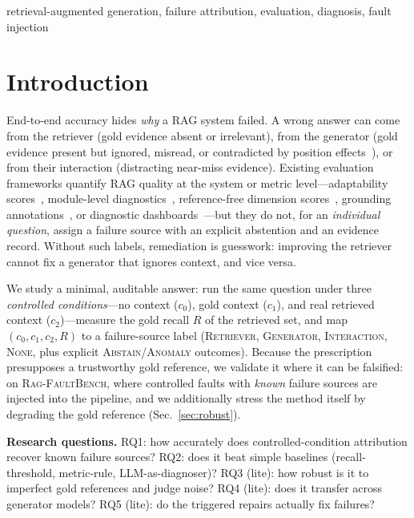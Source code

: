 \documentclass[conference]{IEEEtran}
\begin{document}
\begin{IEEEkeywords}
retrieval-augmented generation, failure attribution, evaluation, diagnosis,
fault injection
\end{IEEEkeywords}

\section{Introduction}
End-to-end accuracy hides \emph{why} a RAG system failed. A wrong answer can
come from the retriever (gold evidence absent or irrelevant), from the
generator (gold evidence present but ignored, misread, or contradicted by
position effects~\cite{liu2024lost}), or from their interaction (distracting
near-miss evidence). Existing evaluation frameworks quantify RAG quality at
the system or metric level---adaptability scores~\cite{park2025mirage},
module-level diagnostics~\cite{ru2024ragchecker}, reference-free dimension
scores~\cite{es2024ragas}, grounding annotations~\cite{sorodoc2025garage},
or diagnostic dashboards~\cite{murugaraj2026ragvue}---but they do not, for an
\emph{individual question}, assign a failure source with an explicit
abstention and an evidence record. Without such labels, remediation is
guesswork: improving the retriever cannot fix a generator that ignores
context, and vice versa.

We study a minimal, auditable answer: run the same question under three
\emph{controlled conditions}---no context ($c_0$), gold context ($c_1$), and
real retrieved context ($c_2$)---measure the gold recall $R$ of the retrieved
set, and map $(c_0,c_1,c_2,R)$ to a failure-source label
(\textsc{Retriever}, \textsc{Generator}, \textsc{Interaction}, \textsc{None},
plus explicit \textsc{Abstain}/\textsc{Anomaly} outcomes). Because the
prescription presupposes a trustworthy gold reference, we validate it where
it can be falsified: on \textsc{Rag-FaultBench}, where controlled faults with
\emph{known} failure sources are injected into the pipeline, and we
additionally stress the method itself by degrading the gold reference
(Sec.~\ref{sec:robust}).

\textbf{Research questions.} RQ1: how accurately does controlled-condition
attribution recover known failure sources? RQ2: does it beat simple
baselines (recall-threshold, metric-rule, LLM-as-diagnoser)? RQ3 (lite): how
robust is it to imperfect gold references and judge noise? RQ4 (lite): does
it transfer across generator models? RQ5 (lite): do the triggered repairs
actually fix failures?
\end{document}
